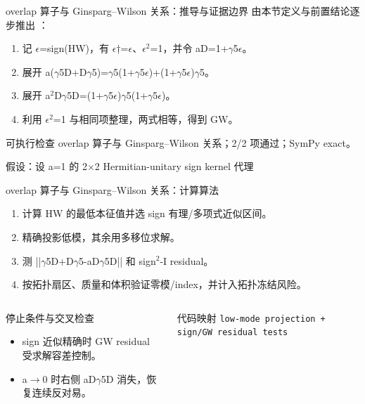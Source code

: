 \begin{frame}[t]{overlap 算子与 Ginsparg--Wilson 关系：推导与证据边界}
\footnotesize
{}\quad 由本节定义与前置结论逐步推出 ：
\begin{enumerate}
\item 记 \ensuremath{\epsilon}=sign(HW)，有 \ensuremath{\epsilon}†=\ensuremath{\epsilon}、\ensuremath{\epsilon}\ensuremath{^{2}}=1，并令 aD=1+\ensuremath{\gamma}5\ensuremath{\epsilon}。
\item 展开 a(\ensuremath{\gamma}5D+D\ensuremath{\gamma}5)=\ensuremath{\gamma}5(1+\ensuremath{\gamma}5\ensuremath{\epsilon})+(1+\ensuremath{\gamma}5\ensuremath{\epsilon})\ensuremath{\gamma}5。
\item 展开 a\ensuremath{^{2}}D\ensuremath{\gamma}5D=(1+\ensuremath{\gamma}5\ensuremath{\epsilon})\ensuremath{\gamma}5(1+\ensuremath{\gamma}5\ensuremath{\epsilon})。
\item 利用 \ensuremath{\epsilon}\ensuremath{^{2}}=1 与相同项整理，两式相等，得到 GW。
\end{enumerate}\begin{block}{可执行检查}
\quad overlap 算子与 Ginsparg--Wilson 关系；2/2 项通过；SymPy exact。
\par\scriptsize 假设：设 a=1 的 2\ensuremath{\times}2 Hermitian-unitary sign kernel 代理
\end{block}
\end{frame}

\begin{frame}[t]{overlap 算子与 Ginsparg--Wilson 关系：计算算法}
\footnotesize
{}\begin{enumerate}
\item 计算 HW 的最低本征值并选 sign 有理/\allowbreak{}多项式近似区间。
\item 精确投影低模，其余用多移位求解。
\item 测 ||\ensuremath{\gamma}5D+D\ensuremath{\gamma}5-aD\ensuremath{\gamma}5D|| 和 sign\ensuremath{^{2}}-I residual。
\item 按拓扑扇区、质量和体积验证零模/\allowbreak{}index，并计入拓扑冻结风险。
\end{enumerate}\begin{columns}[T,onlytextwidth]
\begin{block}{停止条件与交叉检查}\scriptsize\begin{itemize}
\item[\CheckMark] sign 近似精确时 GW residual 受求解容差控制。
\item[\CheckMark] a\ensuremath{\rightarrow}0 时右侧 aD\ensuremath{\gamma}5D 消失，恢复连续反对易。
\end{itemize}\end{block}
\begin{block}{代码映射}
\scriptsize \texttt{low-mode projection + sign/\allowbreak{}GW residual tests}
\end{block}\end{columns}\end{frame}

